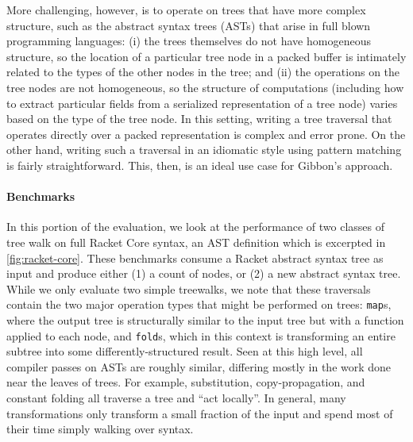 \documentclass[a4paper,english]{lipics-v2016}
\newcommand{\treelang}{Gibbon\xspace} %
\begin{document}
More challenging, however, is to operate on trees that have more complex
structure, such as the abstract syntax trees (ASTs) that arise in full blown
programming languages: (i) the trees themselves do not have homogeneous structure, so the
location of a particular tree node in a packed buffer is intimately related to
the types of the other nodes in the tree; and (ii) the operations on the tree
nodes are not homogeneous, so the structure of computations (including how to
extract particular fields from a serialized representation of a tree node)
varies based on the type of the tree node. In this setting, writing a tree
traversal that operates directly over a packed representation is complex and
error prone. On the other hand, writing such a traversal in an idiomatic style
using pattern matching is fairly straightforward. This, then, is an ideal use
case for \treelang{}'s approach.

\paragraph*{Benchmarks}
In this portion of the evaluation, we look at
the performance of two classes of tree walk
on full Racket Core syntax, an AST definition which is excerpted in \cref{fig:racket-core}.
%
These benchmarks consume a Racket abstract syntax tree as input and produce
either (1) a count of nodes, or (2) a new abstract syntax tree.
%
While we only evaluate two simple treewalks,
we note that these traversals contain the two major operation
types that might be performed on trees: {\tt map}s, where the output tree is
structurally similar to the input tree but with a function applied to each node,
and {\tt fold}s, which in this context is transforming an entire subtree into
some differently-structured result.
%
Seen at this high level, all compiler passes on ASTs
are roughly similar, differing mostly in the work done near the leaves of
trees.
%
For example, substitution, copy-propagation, and constant folding all traverse a
tree and ``act locally''.  In general, many transformations only transform a
small fraction of the input and spend most of their time simply walking over syntax.
%
\end{document}
